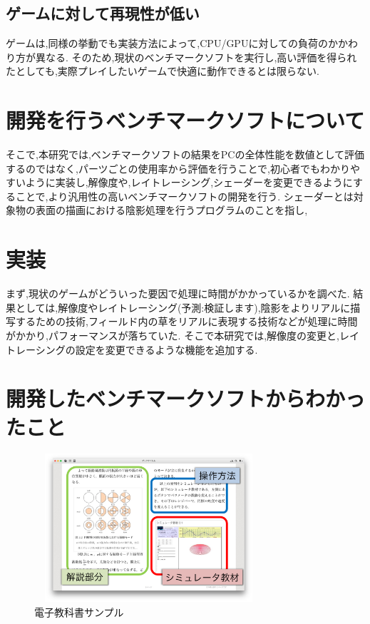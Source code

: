 \documentclass[twocolumn,10pt,a4j]{ltjsarticle}
\begin{document}
 \subsection{ゲームに対して再現性が低い}
ゲームは,同様の挙動でも実装方法によって,CPU/GPUに対しての負荷のかかわり方が異なる.
そのため,現状のベンチマークソフトを実行し,高い評価を得られたとしても,実際プレイしたいゲームで快適に動作できるとは限らない.

\section{開発を行うベンチマークソフトについて}
そこで,本研究では,ベンチマークソフトの結果をPCの全体性能を数値として評価するのではなく,パーツごとの使用率から評価を行うことで,初心者でもわかりやすいように実装し,解像度や,レイトレーシング,シェーダーを変更できるようにすることで,より汎用性の高いベンチマークソフトの開発を行う.
シェーダーとは対象物の表面の描画における陰影処理を行うプログラムのことを指し,

\section{実装}
まず,現状のゲームがどういった要因で処理に時間がかかっているかを調べた.
結果としては,解像度やレイトレーシング(予測:検証します),陰影をよりリアルに描写するための技術,フィールド内の草をリアルに表現する技術などが処理に時間がかかり,パフォーマンスが落ちていた.
そこで本研究では,解像度の変更と,レイトレーシングの設定を変更できるような機能を追加する.

\section{開発したベンチマークソフトからわかったこと}



\begin{figure}[h]
\begin{center}
 \includegraphics[clip,width=85mm,height=55mm]{textbook.pdf}
\end{center}
 \caption{電子教科書サンプル}
 \label{fig:教科書}
\end{figure}
\end{document}
